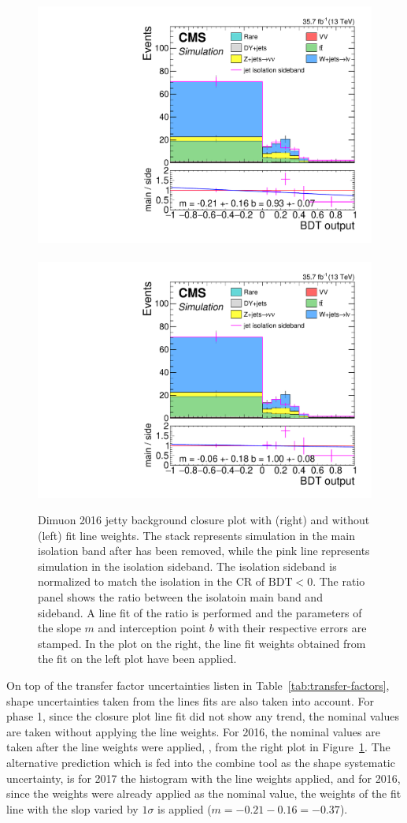 \begin{figure}[!htb]
\centering
\includegraphics[width=0.48\linewidth]{plots/dilepton_muons_bg_isocr_no_retag_CorrJetNoMultIso10_06_2016_no_norm_sf/none_closure_dilepBDTphase1CorrJetNoMultIso10Dr0.6.pdf} \,
\includegraphics[width=0.48\linewidth]{plots/dilepton_muons_bg_isocr_no_retag_CorrJetNoMultIso10_06_2016_no_norm_sf_line_fit_line_weights/none_closure_dilepBDTphase1CorrJetNoMultIso10Dr0.6.pdf} 
 \\

\caption[Dimuon 2016 jetty background closure plots with and without fit line weights]{Dimuon 2016 jetty background closure plot with (right) and without (left) fit line weights. The stack represents simulation in the main isolation band after \ztautau has been removed, while the pink line represents simulation in the isolation sideband. The isolation sideband is normalized to match the isolation in the CR of $\mathrm{BDT} < 0$. The ratio panel shows the ratio between the isolatoin main band and sideband. A line fit of the ratio is performed and the parameters of the slope $m$ and interception point $b$ with their respective errors are stamped. In the plot on the right, the line fit weights obtained from the fit on the left plot have been applied.}
\label{fig:dimuon-bdt-jetty-2016-closure}
\end{figure}


On top of the transfer factor uncertainties listen in Table~\ref{tab:transfer-factors}, shape uncertainties taken from the lines fits are also taken into account. For phase 1, since the closure plot line fit did not show any trend, the nominal values are taken without applying the line weights. For 2016, the nominal values are taken after the line weights were applied, \ie, from the right plot in Figure~\ref{fig:dimuon-bdt-jetty-2016-closure}. The alternative prediction which is fed into the combine tool as the shape systematic uncertainty, is for 2017 the histogram with the line weights applied, and for 2016, since the weights were already applied as the nominal value, the weights of the fit line with the slop varied by $1\sigma$ is applied ($m=-0.21-0.16=-0.37$).


